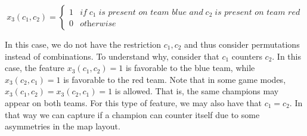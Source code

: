 \[x_3(c_1, c_2) = \begin{cases} 1 & \textit{if} \; c_1 \; \textit{is present on team blue and} \; c_2 \; \textit{is present on team red} \\ 
						  	    0 & \textit{otherwise} \end{cases}\]

In this case, we do not have the restriction $c_1, c_2$ and thus consider permutations instead of combinations.
To understand why, consider that $c_1$ counters $c_2$.
In this case, the feature $x_3(c_1, c_2) = 1$ is favorable to the blue team, while $x_3(c_2, c_1) = 1$ is favorable to the red team.
Note that in some game modes, $x_3(c_1, c_2) = x_3(c_2, c_1) = 1$ is allowed. That is, the same champions may appear on both teams.
For this type of feature, we may also have that $c_1 = c_2$.
In that way we can capture if a champion can counter itself due to some asymmetries in the map layout.